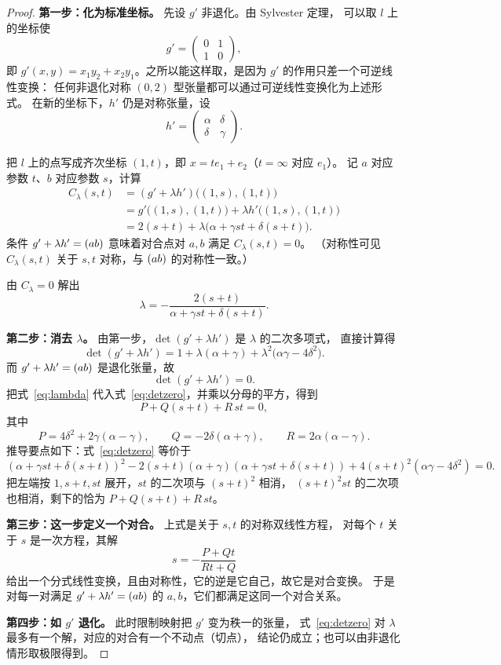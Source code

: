 \begin{proof}
\textbf{第一步：化为标准坐标。} 先设 $g'$ 非退化。由 Sylvester 定理，
可以取 $l$ 上的坐标使
\[
g'=\begin{pmatrix}0&1\\1&0\end{pmatrix},
\]
即 $g'(x,y)=x_1y_2+x_2y_1$。之所以能这样取，是因为 $g'$ 的作用只差一个可逆线性变换：
任何非退化对称 $(0,2)$ 型张量都可以通过可逆线性变换化为上述形式。
在新的坐标下，$h'$ 仍是对称张量，设
\[
h'=\begin{pmatrix}\alpha&\delta\\\delta&\gamma\end{pmatrix}.
\]

把 $l$ 上的点写成齐次坐标 $(1,t)$，即 $x=t e_1+e_2$（$t=\infty$ 对应 $e_1$）。
记 $a$ 对应参数 $t$、$b$ 对应参数 $s$，计算
\begin{align*}
C_\lambda(s,t)
&=(g'+\lambda h')\bigl((1,s),(1,t)\bigr)\\
&=g'\bigl((1,s),(1,t)\bigr)+\lambda h'\bigl((1,s),(1,t)\bigr)\\
&=2(s+t)+\lambda\bigl(\alpha+\gamma st+\delta(s+t)\bigr).
\end{align*}
条件 $g'+\lambda h'=(ab)$ 意味着对合点对 $a,b$ 满足 $C_\lambda(s,t)=0$。
（对称性可见 $C_\lambda(s,t)$ 关于 $s,t$ 对称，与 $(ab)$ 的对称性一致。）

由 $C_\lambda=0$ 解出
\begin{equation}\label{eq:lambda}
\lambda=-\frac{2(s+t)}{\alpha+\gamma st+\delta(s+t)} .
\end{equation}

\textbf{第二步：消去 $\lambda$。} 由第一步，$\det(g'+\lambda h')$ 是 $\lambda$ 的二次多项式，
直接计算得
\[
\det(g'+\lambda h')
=1+\lambda(\alpha+\gamma)+\lambda^2\bigl(\alpha\gamma-4\delta^2\bigr).
\]
而 $g'+\lambda h'=(ab)$ 是退化张量，故
\begin{equation}\label{eq:detzero}
\det(g'+\lambda h')=0 .
\end{equation}
把式~\eqref{eq:lambda} 代入式~\eqref{eq:detzero}，并乘以分母的平方，得到
\[
P+Q(s+t)+R\,st=0 ,
\]
其中
\[
P=4\delta^2+2\gamma(\alpha-\gamma),\qquad
Q=-2\delta(\alpha+\gamma),\qquad
R=2\alpha(\alpha-\gamma).
\]
推导要点如下：式~\eqref{eq:detzero} 等价于
\[
(\alpha+\gamma st+\delta(s+t))^2
-2(s+t)(\alpha+\gamma)(\alpha+\gamma st+\delta(s+t))
+4(s+t)^2(\alpha\gamma-4\delta^2)=0 .
\]
把左端按 $1,s+t,st$ 展开，$st$ 的二次项与 $(s+t)^2$ 相消，
$(s+t)^2st$ 的二次项也相消，剩下的恰为 $P+Q(s+t)+R\,st$。

\textbf{第三步：这一步定义一个对合。} 上式是关于 $s,t$ 的对称双线性方程，
对每个 $t$ 关于 $s$ 是一次方程，其解
\[
s=-\frac{P+Qt}{Rt+Q}
\]
给出一个分式线性变换，且由对称性，它的逆是它自己，故它是对合变换。
于是对每一对满足 $g'+\lambda h'=(ab)$ 的 $a,b$，它们都满足这同一个对合关系。

\textbf{第四步：如 $g'$ 退化。} 此时限制映射把 $g'$ 变为秩一的张量，
式~\eqref{eq:detzero} 对 $\lambda$ 最多有一个解，对应的对合有一个不动点（切点），
结论仍成立；也可以由非退化情形取极限得到。
\end{proof}

